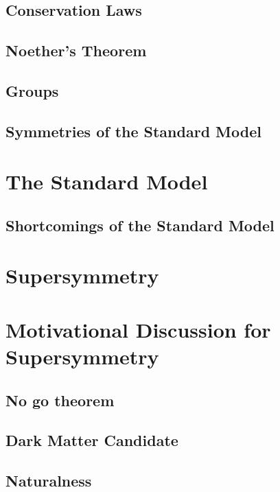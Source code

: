 \subsection{Conservation Laws}

\subsection{Noether's Theorem}

\subsection{Groups}

\subsection{Symmetries of the Standard Model}

\section{The Standard Model}

\subsection{Shortcomings of the Standard Model}

\section{Supersymmetry}

\section{Motivational Discussion for Supersymmetry}

\subsection{No go theorem}
\subsection{Dark Matter Candidate}
\subsection{Naturalness}


